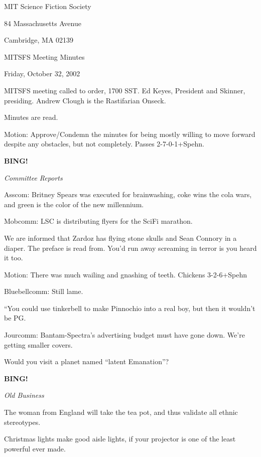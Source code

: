 \documentclass[12pt]{article}
\newcommand{\bing}{{\bf BING!} }
\newcommand{\goto}[1]{\bing \vskip 12pt \centerline{{\em{#1}}}}
\begin{document}
\begin{center}

MIT Science Fiction Society

84 Massachusetts Avenue

Cambridge, MA 02139

\vspace{12pt}

MITSFS Meeting Minutes

Friday, October 32, 2002

\end{center}

\vspace{18pt}

\setlength{\parskip}{6pt}

\noindent
MITSFS meeting called to order, 1700 SST.  Ed Keyes, President and Skinner, presiding.  Andrew Clough is the Rastifarian Onseck.

Minutes are read.

Motion:  Approve/Condemn the minutes for being mostly willing to move forward despite any obstacles, but not completely.  Passes 2-7-0-1+Spehn.

\goto{Committee Reports}

Asscom:  Britney Spears was executed for brainwashing, coke wins the cola wars, and green is the color of the new millennium.

Mobcomm:  LSC is distributing flyers for the SciFi marathon.  

We are informed that Zardoz has flying stone skulls and Sean Connory in a diaper.  The preface is read from.  You'd run away screaming in terror is you heard it too.

Motion:  There was much wailing and gnashing of teeth. Chickens 3-2-6+Spehn

Bluebellcomm:  Still lame.

``You could use tinkerbell to make Pinnochio into a real boy, but then it wouldn't be PG.

Jourcomm: Bantam-Spectra's advertising budget must have gone down.  We're getting smaller covers.

Would you visit a planet named ``latent Emanation''?

\goto{Old Business}

The woman from England will take the tea pot, and thus validate all ethnic stereotypes.

Christmas lights make good aisle lights, if your projector is one of the least powerful ever made.
\end{document}
